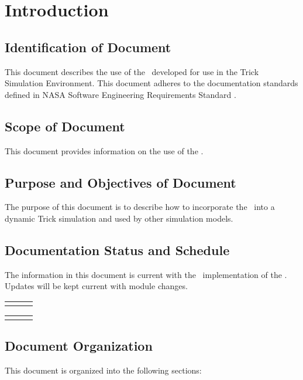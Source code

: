 \chapter{Introduction}\label{sec:intro}



\section{Identification of Document}
This document describes the use of the
\TrickHLA\ developed for use in the Trick Simulation Environment.
This document adheres to the documentation standards defined in
NASA Software Engineering Requirements Standard \cite{NASA:SWE}.

\section{Scope of Document}
This document provides information on the use of the \TrickHLA.

\section{Purpose and Objectives of Document}
The purpose of this document is to describe how to incorporate the
\TrickHLA\ into a dynamic Trick simulation and used by other simulation models.

\section{Documentation Status and Schedule}
The information in this document is current with the \TrickHLAid\
implementation of the \TrickHLA. Updates will be kept current with
module changes.

\begin{tabular}{||l|l|l|} \hline
\documentHistory
\end{tabular}

\begin{tabular}{||l|l|l|} \hline
\DocumentChangeHistory
\end{tabular}

\section{Document Organization}
This document is organized into the following sections:

